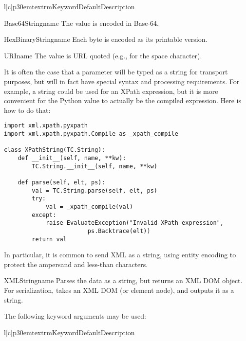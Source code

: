 \begin{tableiii}{l|c|p{30em}}{textrm}{Keyword}{Default}{Description}
\end{tableiii}

\begin{classdesc}{Base64String}{name}
The value is encoded in Base-64.
\end{classdesc}

\begin{classdesc}{HexBinaryString}{name}
Each byte is encoded as its printable version.
\end{classdesc}

\begin{classdesc}{URI}{name}
The value is URL quoted (e.g.,  for the space character).
\end{classdesc}

It is often the case that a parameter will be typed as a string for
transport purposes, but will in fact have special syntax and processing
requirements.
For example, a string could be used for an XPath expression, but it is
more convenient for the Python value to
actually be the compiled expression. Here is how to do that:

\begin{verbatim}
import xml.xpath.pyxpath
import xml.xpath.pyxpath.Compile as _xpath_compile

class XPathString(TC.String):
    def __init__(self, name, **kw):
        TC.String.__init__(self, name, **kw)

    def parse(self, elt, ps):
        val = TC.String.parse(self, elt, ps)
        try:
            val = _xpath_compile(val)
        except:
            raise EvaluateException("Invalid XPath expression",
                        ps.Backtrace(elt))
        return val
\end{verbatim}

In particular, it is common to send XML as a string, using entity
encoding to protect the ampersand and less-than characters.

\begin{classdesc}{XMLString}{name}
Parses the data as a string, but returns an XML DOM object.
For serialization, takes an XML DOM (or element node), and outputs
it as a string.

The following keyword arguments may be used:

\begin{tableiii}{l|c|p{30em}}{textrm}{Keyword}{Default}{Description}
\end{tableiii}

\end{classdesc}

